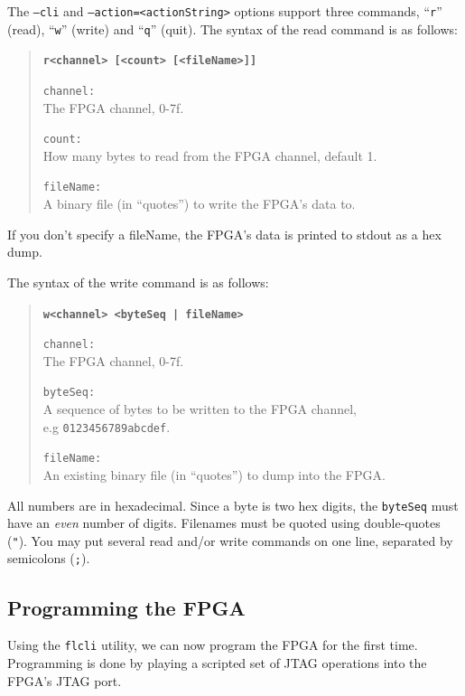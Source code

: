 \newpage
The \texttt{--cli} and \texttt{--action=<actionString>} options support three commands, ``\texttt{r}'' (read), ``\texttt{w}'' (write) and ``\texttt{q}'' (quit). The syntax of the read command is as follows:

\begin{quote}
\textbf{\texttt{r<channel> [<count> [<fileName>]]}}

\begin{desc}
  \item[\texttt{channel:}] \hfill \\
    The FPGA channel, 0-7f.
  \item[\texttt{count:}] \hfill \\
    How many bytes to read from the FPGA channel, default 1.
  \item[\texttt{fileName:}] \hfill \\
    A binary file (in ``quotes'') to write the FPGA's data to.
\end{desc}
\end{quote}

If you don't specify a fileName, the FPGA's data is printed to stdout as a hex dump.

The syntax of the write command is as follows:

\begin{quote}
\textbf{\texttt{w<channel> <byteSeq | fileName>}}

\begin{desc}
  \item[\texttt{channel:}] \hfill \\
    The FPGA channel, 0-7f.
  \item[\texttt{byteSeq:}] \hfill \\
    A sequence of bytes to be written to the FPGA channel,\\e.g \texttt{0123456789abcdef}.
  \item[\texttt{fileName:}] \hfill \\
    An existing binary file (in ``quotes'') to dump into the FPGA.
\end{desc}
\end{quote}

All numbers are in hexadecimal. Since a byte is two hex digits, the \texttt{byteSeq} must have an \textit{even} number of digits. Filenames must be quoted using double-quotes (\texttt{"}). You may put several read and/or write commands on one line, separated by semicolons (\texttt{;}).

\newpage
\subsection{Programming the FPGA}
Using the \texttt{flcli} utility, we can now program the FPGA for the first time. Programming is done by playing a scripted set of JTAG operations into the FPGA's JTAG port.

